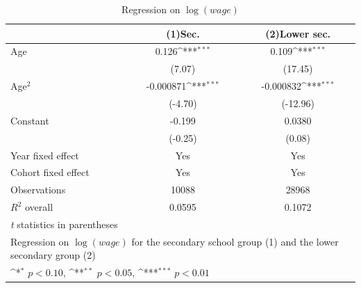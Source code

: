\begin{table}[htbp]\centering
\def\sym#1{\ifmmode^{#1}\else\(^{#1}\)\fi}
\caption{Regression on \(\log(wage)\)\label{Tab:reg1}}
\begin{tabular}{l*{2}{c}}
\toprule
                    &\multicolumn{1}{c}{(1)Sec.\label{reg1_w_heduc}}         &\multicolumn{1}{c}{(2)Lower sec.\label{reg1_w_leduc}}         \\
\midrule
Age                 &       0.126\sym{***}&       0.109\sym{***}\\
                    &      (7.07)         &     (17.45)         \\
\addlinespace
Age\(^2\)           &   -0.000871\sym{***}&   -0.000832\sym{***}\\
                    &     (-4.70)         &    (-12.96)         \\
\addlinespace
Constant            &      -0.199         &      0.0380         \\
                    &     (-0.25)         &      (0.08)         \\
\addlinespace
Year fixed effect & Yes             &       Yes\\
\addlinespace
Cohort fixed effect& Yes    &           Yes\\
\midrule
Observations        &       10088         &       28968         \\
$R^2$ overall       &   0.0595&0.1072 \\
\bottomrule
\multicolumn{3}{l}{\footnotesize \textit{t} statistics in parentheses}\\
\multicolumn{3}{l}{\footnotesize Regression on \(\log(wage)\) for the secondary school group (1) and the lower secondary group (2)}\\
\multicolumn{3}{l}{\footnotesize \sym{*} \(p<0.10\), \sym{**} \(p<0.05\), \sym{***} \(p<0.01\)}\\
\end{tabular}
\end{table}

